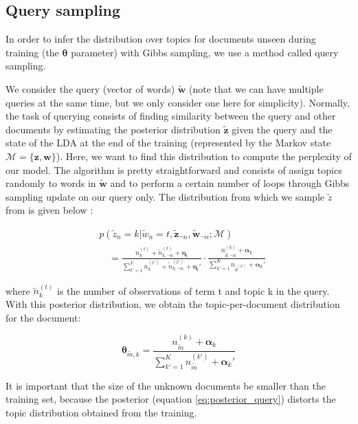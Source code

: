 \documentclass{article}
\begin{document}
\subsection{Query sampling}

In order to infer the distribution over topics for documents unseen during training (the $\bm{\theta}$ parameter) with Gibbs sampling, we use a method called query sampling.

We consider the query (vector of words) $\tilde{\mathbf{w}}$ (note that we can have multiple queries at the same time, but we only consider one here for simplicity). Normally, the task of querying consists of finding similarity between the query and other documents by estimating the posterior distribution $\tilde{\mathbf{z}}$ given the query and the state of the LDA at the end of the training (represented by the Markov state $\bm{\mathcal{M}}=\{ \mathbf{z},\mathbf{w} \}$). Here, we want to find this distribution to compute the perplexity of our model. The algorithm is pretty straightforward and consists of assign topics randomly to words in $\tilde{\mathbf{w}}$ and to perform a certain number of loops through Gibbs sampling update on our query only. The distribution from which we sample $\tilde{z}$ from is given below :

\begin{align}\label{eq:posterior_query}
& p(\tilde{z}_n=k|\tilde{w}_n=t, \tilde{\mathbf{z}}_{\neg n},\tilde{\mathbf{w}}_{\neg n};\bm{\mathcal{M}}) \nonumber\\
& \quad = \frac{n_k ^{(t)} + \tilde{n}_{k, \neg n} ^{(t)} + \bm{\eta}_t}{\sum_{t'=1}^V n_k ^{(t')} + \tilde{n}_{k, \neg n} ^{(t')} + \bm{\eta}_t'} \cdot \frac{n_{\tilde{d},\neg n}^{(k)} + \bm{\alpha}_k}{\sum_{k'=1}^K n_{\tilde{d}^{(k')}} + \bm{\alpha}_k'}
\end{align}

where $\tilde{n}_k ^{(t)}$ is the number of observations of term t and topic k in the query. With this posterior distribution, we obtain the topic-per-document distribution for the document:

\begin{equation}
\bm{\theta}_{\tilde{m},k} = \frac{n_{\tilde{m}}^{(k)} + \bm{\alpha}_k}{\sum_{k'=1}^K n_{\tilde{m}}^{(k')} + \bm{\alpha}_k'}
\end{equation}

It is important that the size of the unknown documents be smaller than the training set, because the posterior (equation \ref{eq:posterior_query}) distorts the topic distribution obtained from the training.
\end{document}
